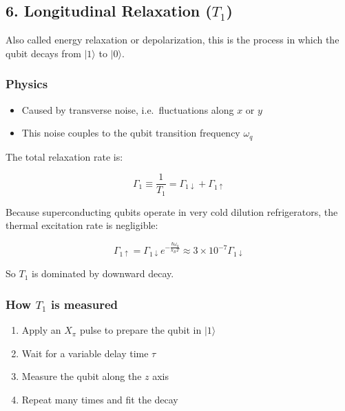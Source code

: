 \documentclass[
]{article}
\providecommand{\tightlist}{%
  \setlength{\itemsep}{0pt}\setlength{\parskip}{0pt}}
\begin{document}
\subsection{\texorpdfstring{6. Longitudinal Relaxation
(\(T_1\))}{6. Longitudinal Relaxation (T\_1)}}\label{longitudinal-relaxation-t_1}

Also called energy relaxation or depolarization, this is the process in
which the qubit decays from \(|1\rangle\) to \(|0\rangle\).

\subsubsection{Physics}\label{physics}

\begin{itemize}
\tightlist
\item
  Caused by transverse noise, i.e.~fluctuations along \(x\) or \(y\)
\item
  This noise couples to the qubit transition frequency \(\omega_q\)
\end{itemize}

The total relaxation rate is:

\[
\Gamma_1 \equiv \frac{1}{T_1} = \Gamma_{1\downarrow} + \Gamma_{1\uparrow}
\]

Because superconducting qubits operate in very cold dilution
refrigerators, the thermal excitation rate is negligible:

\[
\Gamma_{1\uparrow} = \Gamma_{1\downarrow}e^{-\frac{\hbar\omega_q}{k_BT}} \approx 3\times 10^{-7}\Gamma_{1\downarrow}
\]

So \(T_1\) is dominated by downward decay.

\subsubsection{\texorpdfstring{How \(T_1\) is
measured}{How T\_1 is measured}}\label{how-t_1-is-measured}

\begin{enumerate}
\def\labelenumi{\arabic{enumi}.}
\tightlist
\item
  Apply an \(X_\pi\) pulse to prepare the qubit in \(|1\rangle\)
\item
  Wait for a variable delay time \(\tau\)
\item
  Measure the qubit along the \(z\) axis
\item
  Repeat many times and fit the decay
\end{enumerate}
\end{document}
